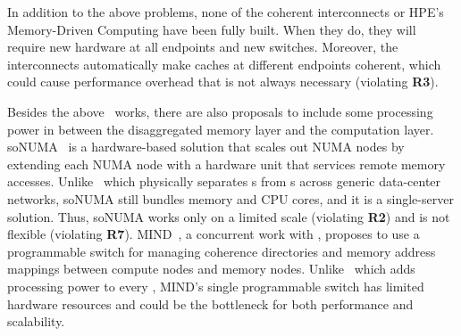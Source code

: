 In addition to the above problems, none of the coherent interconnects or HPE's Memory-Driven Computing have been fully built.
When they do, they will require new hardware at all endpoints and new switches. 
Moreover, the interconnects automatically make caches at different endpoints coherent, which could cause performance overhead that is not always necessary (violating \textbf{R3}).

Besides the above \pdm\ works, there are also proposals to include some processing power in between the disaggregated memory layer and the computation layer.
soNUMA~\cite{soNUMA} is a hardware-based solution that scales out NUMA nodes by extending each NUMA node with a hardware unit that services remote memory accesses.
Unlike \sys\ which physically separates \MN{}s from \CN{}s across generic data-center networks, soNUMA still bundles memory and CPU cores, and it is a single-server solution.
Thus, soNUMA works only on a limited scale (violating \textbf{R2}) and is not flexible (violating \textbf{R7}).
MIND~\cite{mind:sosp21}, a concurrent work with \sys, proposes to use a programmable switch for managing coherence directories and memory address mappings between compute nodes and memory nodes.
Unlike \sys\ which adds processing power to every \MN, MIND's single programmable switch has limited hardware resources and could be the bottleneck for both performance and scalability.
